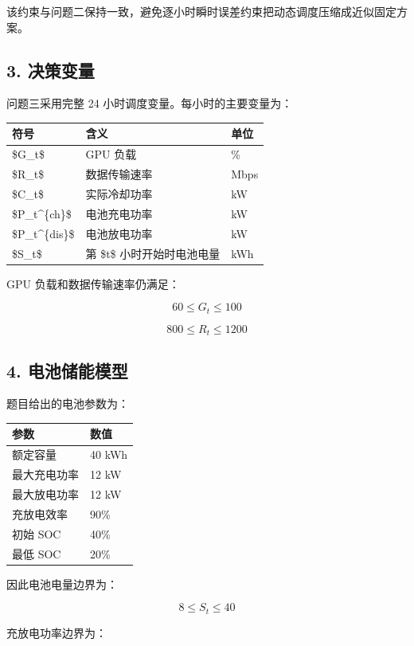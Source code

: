 \documentclass[
]{article}
\begin{document}
该约束与问题二保持一致，避免逐小时瞬时误差约束把动态调度压缩成近似固定方案。

\subsection{3. 决策变量}\label{3-ux51b3ux7b56ux53d8ux91cf}

问题三采用完整 24 小时调度变量。每小时的主要变量为：

\begin{longtable}[]{@{}lll@{}}
\toprule\noalign{}
符号 & 含义 & 单位 \\
\midrule\noalign{}
\endhead
\bottomrule\noalign{}
\endlastfoot
\$G\_t\$ & GPU 负载 & \% \\
\$R\_t\$ & 数据传输速率 & Mbps \\
\$C\_t\$ & 实际冷却功率 & kW \\
\$P\_t\^{}\{ch\}\$ & 电池充电功率 & kW \\
\$P\_t\^{}\{dis\}\$ & 电池放电功率 & kW \\
\$S\_t\$ & 第 \$t\$ 小时开始时电池电量 & kWh \\
\end{longtable}

GPU 负载和数据传输速率仍满足：

\[60\le G_t\le 100\]

\[800\le R_t\le 1200\]

\subsection{4.
电池储能模型}\label{4-ux7535ux6c60ux50a8ux80fdux6a21ux578b}

题目给出的电池参数为：

\begin{longtable}[]{@{}ll@{}}
\toprule\noalign{}
参数 & 数值 \\
\midrule\noalign{}
\endhead
\bottomrule\noalign{}
\endlastfoot
额定容量 & 40 kWh \\
最大充电功率 & 12 kW \\
最大放电功率 & 12 kW \\
充放电效率 & 90\% \\
初始 SOC & 40\% \\
最低 SOC & 20\% \\
\end{longtable}

因此电池电量边界为：

\[8\le S_t\le 40\]

充放电功率边界为：
\end{document}
